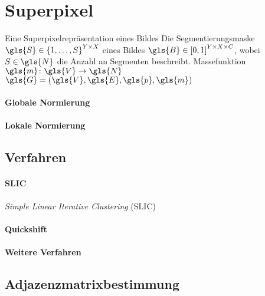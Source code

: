 \section{Superpixel}
\label{superpixel}

Eine Superpixelrepräsentation eines Bildes
Die Segmentierungsmaske $\gls{S} \in {\left\{1, \ldots, S\right\}}^{Y \times X}$ eines Bildes $\gls{B} \in {\left[0, 1\right]}^{Y \times X \times C}$, wobei $S \in \gls{N}$ die Anzahl an Segmenten beschreibt.
Massefunktion $\gls{m} \colon \gls{V} \to \gls{N}$
$\gls{G} = \left(\gls{V}, \gls{E}, \gls{p}, \gls{m}\right)$

\paragraph{Globale Normierung}
\label{globale_normierung}

\paragraph{Lokale Normierung}
\label{globale_normierung}

\subsection{Verfahren}
\label{superpixel_verfahren}

\paragraph{SLIC}
\label{slic}

\cite{slic}

\emph{Simple Linear Iterative Clustering} (SLIC)

\paragraph{Quickshift}
\label{quickshift}

\cite{quickshift}

\paragraph{Weitere Verfahren}
\label{weitere_superpixel_verfahren}

\cite{felzenszwalb}

\subsection{Adjazenzmatrixbestimmung}
\label{adjazenzmatrixbestimmung}

